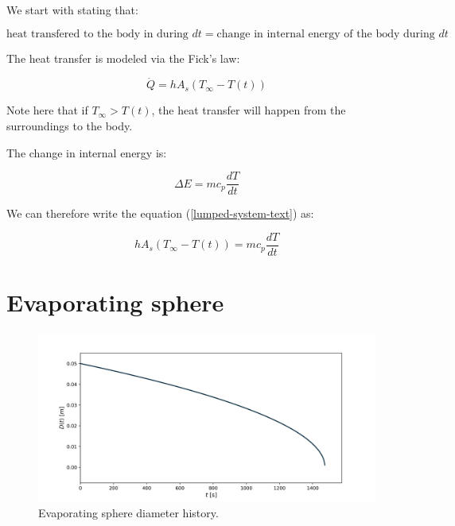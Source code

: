 \documentclass[10pt]{article}
\begin{document}
We start with stating that:

\begin{equation} \label{lumped-system-text}
\text{heat transfered to the body in during $dt$} = \text{change in internal energy of the body during $dt$}
\end{equation}

The heat transfer is modeled via the Fick's law:

\begin{equation}
\dot{Q} = h A_s (T_{\infty} - T(t))
\end{equation}

Note here that if $T_{\infty} > T(t)$, the heat transfer will happen from the surroundings to the body.

The change in internal energy is:

\begin{equation}
\Delta E = m c_p \frac{dT}{dt}
\end{equation}

We can therefore write the equation (\ref{lumped-system-text}) as:

\begin{equation}
h A_s (T_{\infty} - T(t)) = m c_p \frac{dT}{dt}
\end{equation}










\newpage

\section{Evaporating sphere}

\begin{figure}[H]
\centering\includegraphics[width=16cm]{Code/evaporating-sphere.png}
\caption{Evaporating sphere diameter history.}
\label{fig:stefan-problem}
\end{figure}
\end{document}
